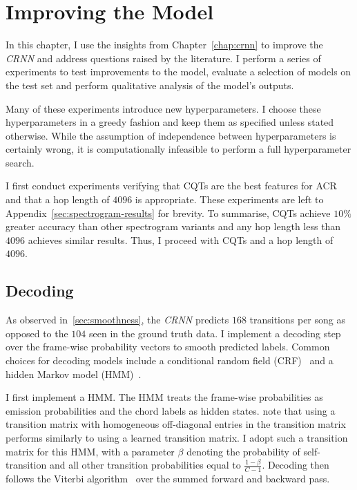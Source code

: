 \chapter{Improving the Model}\label{chap:model_improvements}

In this chapter, I use the insights from Chapter~\ref{chap:crnn} to improve the \emph{CRNN} and address questions raised by the literature. I perform a series of experiments to test improvements to the model, evaluate a selection of models on the test set and perform qualitative analysis of the model's outputs.

Many of these experiments introduce new hyperparameters. I choose these hyperparameters in a greedy fashion and keep them as specified unless stated otherwise. While the assumption of independence between hyperparameters is certainly wrong, it is computationally infeasible to perform a full hyperparameter search.

I first conduct experiments verifying that CQTs are the best features for ACR and that a hop length of $4096$ is appropriate. These experiments are left to Appendix~\ref{sec:spectrogram-results} for brevity. To summarise, CQTs achieve $10\%$ greater accuracy than other spectrogram variants and any hop length less than $4096$ achieves similar results. Thus, I proceed with CQTs and a hop length of $4096$.

\section{Decoding}\label{sec:decoding}

As observed in~\ref{sec:smoothness}, the \emph{CRNN} predicts $168$ transitions per song as opposed to the $104$ seen in the ground truth data. I implement a decoding step over the frame-wise probability vectors to smooth predicted labels. Common choices for decoding models include a conditional random field (CRF)~\citep{ACRLargeVocab1, BTC} and a hidden Markov model (HMM)~\citep{BalanceRandomForestACR}. 

I first implement a HMM. The HMM treats the frame-wise probabilities as emission probabilities and the chord labels as hidden states. \citet{CQTvsChroma} note that using a transition matrix with homogeneous off-diagonal entries in the transition matrix performs similarly to using a learned transition matrix. I adopt such a transition matrix for this HMM, with a parameter $\beta$ denoting the probability of self-transition and all other transition probabilities equal to $\frac{1-\beta}{C-1}$. Decoding then follows the Viterbi algorithm~\citep{Viterbi} over the summed forward and backward pass.

